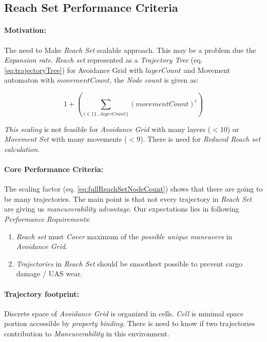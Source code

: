 \subsection{Reach Set Performance Criteria}\label{s:ReachSetPerformanceCriteria}

\paragraph{Motivation:} The need to Make \emph{Reach Set} scalable approach. This may be a problem due the \emph{Expansion rate}. \emph{Reach set} represented as a \emph{Trajectory Tree} (eq. \ref{eq:trajectoryTree}) for Avoidance Grid with $layerCount$ and Movement automaton with $movementCount$, the \emph{Node count} is given as:

\begin{equation}\label{eq:fullReachSetNodeCount}
    1+ \left(\sum_{i\in\{1\dots layerCount\}} (movementCount)^i\right)
\end{equation}

\noindent \emph{This scaling} is not feasible for \emph{Avoidance Grid} with many layers ($< 10$) or \emph{Movement Set} with many movements ($< 9$). There is need for \emph{Reduced Reach set calculation}.

\paragraph{Core Performance Criteria:} The scaling factor (eq. \ref{eq:fullReachSetNodeCount}) shows that there are going to be many trajectories. The main point is that not every trajectory in \emph{Reach Set} are giving us \emph{maneuverability advantage}. Our expectations lies in following \emph{Performance Requirements}:

\begin{enumerate}
    \item \emph{Reach set} must \emph{Cover} maximum of the \emph{possible unique maneuvers} in  \emph{Avoidance Grid}.
    \item \emph{Trajectories} in \emph{Reach Set} should be smoothest possible to prevent cargo damage / UAS wear.
\end{enumerate}

\paragraph{Trajectory footprint:} Discrete space of \emph{Avoidance Grid} is organized in cells. \emph{Cell} is minimal space portion accessible by \emph{property binding}. There is need to know if two trajectories contribution to \emph{Maneuverability} in this environment. 

